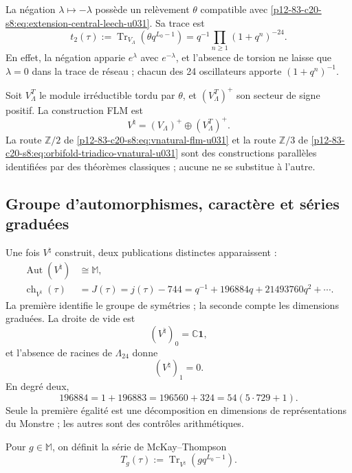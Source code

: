 La négation \(\lambda\mapsto-\lambda\) possède un relèvement
\(\theta\) compatible avec \eqref{p12-83-c20-s8:eq:extension-central-leech-u031}. Sa trace
est
\begin{equation}
 t_2(\tau)
 :=
 \operatorname{Tr}_{V_\Lambda}
 (\theta q^{L_0-1})
 =q^{-1}\prod_{n\ge1}(1+q^n)^{-24}.
 \label{p12-83-c20-s8:eq:t2-leech-u031}
\end{equation}
En effet, la négation apparie \(e^\lambda\) avec \(e^{-\lambda}\), et
l'absence de torsion ne laisse que \(\lambda=0\) dans la trace de réseau ; chacun
des 24 oscillateurs apporte \((1+q^n)^{-1}\).

Soit \(V_\Lambda^T\) le module irréductible tordu par \(\theta\), et
\((V_\Lambda^T)^+\) son secteur de signe positif. La construction FLM est
\begin{equation}
 V^\natural
 =(V_\Lambda)^+\oplus(V_\Lambda^T)^+.
 \label{p12-83-c20-s8:eq:vnatural-flm-u031}
\end{equation}
La route \(\mathbb Z/2\) de
\eqref{p12-83-c20-s8:eq:vnatural-flm-u031} et la route \(\mathbb Z/3\) de
\eqref{p12-83-c20-s8:eq:orbifold-triadico-vnatural-u031} sont des constructions parallèles
identifiées par des théorèmes classiques ; aucune ne se substitue à l'autre.

\subsection{Groupe d'automorphismes, caractère et séries graduées}

Une fois \(V^\natural\) construit, deux publications distinctes apparaissent :
\begin{align}
 \operatorname{Aut}(V^\natural)&\cong\mathbb M,
 \label{p12-83-c20-s8:eq:aut-vnatural-monstruo-u031}\\
 \operatorname{ch}_{V^\natural}(\tau)
 &=J(\tau)=j(\tau)-744
 =q^{-1}+196884q+21493760q^2+\cdots.
 \label{p12-83-c20-s8:eq:caracter-vnatural-j-u031}
\end{align}
La première identifie le groupe de symétries ; la seconde compte les dimensions
graduées. La droite de vide est
\[
 (V^\natural)_0=\mathbb C\mathbf1,
\]
et l'absence de racines de \(\Lambda_{24}\) donne
\[
 (V^\natural)_1=0.
\]
En degré deux,
\[
 196884=1+196883=196560+324=54(5\cdot729+1).
\]
Seule la première égalité est une décomposition en dimensions de
représentations du Monstre ; les autres sont des contrôles arithmétiques.

Pour \(g\in\mathbb M\), on définit la série de McKay--Thompson
\begin{equation}
 T_g(\tau):=
 \operatorname{Tr}_{V^\natural}
 \left(gq^{L_0-1}\right).
 \label{p12-83-c20-s8:eq:serie-mckay-thompson-u031}
\end{equation}

